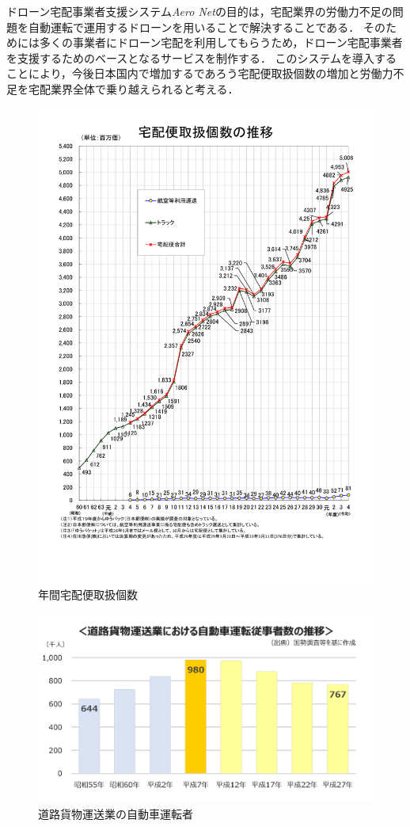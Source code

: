 \documentclass[a4paper, titlepage]{jsarticle}
\newcommand{\system}{\textsl{Aero Net}}
\begin{document}
ドローン宅配事業者支援システム\system の目的は，宅配業界の労働力不足の問題を自動運転で運用するドローンを用いることで解決することである．
そのためには多くの事業者にドローン宅配を利用してもらうため，ドローン宅配事業者を支援するためのベースとなるサービスを制作する．
このシステムを導入することにより，今後日本国内で増加するであろう宅配便取扱個数の増加と労働力不足を宅配業界全体で乗り越えられると考える．
\begin{figure}[H]
  \centering
  \includegraphics[width=\textwidth]{other/number.pdf}
  \caption{年間宅配便取扱個数}
  \label{fig:number}
\end{figure}
\begin{figure}[H]
  \centering
  \includegraphics[width=\textwidth]{other/driver.pdf}
  \caption{道路貨物運送業の自動車運転者}
  \label{fig:driver}
\end{figure}
\end{document}
